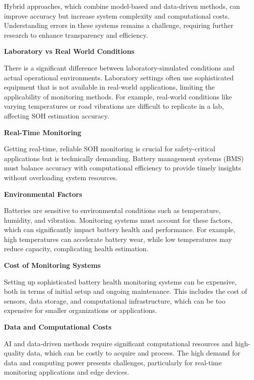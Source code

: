 Hybrid approaches, which combine model-based and data-driven methods, can improve accuracy but increase system complexity and computational costs. 
Understanding errors in these systems remains a challenge, requiring further research to enhance transparency and efficiency.

\vspace{1cm}
\textbf{Laboratory vs Real World Conditions}

There is a significant difference between laboratory-simulated conditions and actual operational environments. 
Laboratory settings often use sophisticated equipment that is not available in real-world applications, limiting the applicability of monitoring methods. For example, real-world conditions like varying temperatures or road vibrations are difficult to replicate in a lab, affecting SOH estimation accuracy.

\vspace{1cm}
\textbf{Real-Time Monitoring}

Getting real-time, reliable SOH monitoring is crucial for safety-critical applications but is technically demanding. 
Battery management systems (BMS) must balance accuracy with computational efficiency to provide timely insights without overloading system resources.

\vspace{1cm}
\textbf{Environmental Factors}

Batteries are sensitive to environmental conditions such as temperature, humidity, and vibration. 
Monitoring systems must account for these factors, which can significantly impact battery health and performance. 
For example, high temperatures can accelerate battery wear, while low temperatures may reduce capacity, complicating health estimation.

\vspace{1cm}
\textbf{Cost of Monitoring Systems}

Setting up sophisticated battery health monitoring systems can be expensive, both in terms of initial setup and ongoing maintenance. 
This includes the cost of sensors, data storage, and computational infrastructure, which can be too expensive for smaller organizations or applications.

\vspace{1cm}
\textbf{Data and Computational Costs}

AI and data-driven methods require significant computational resources and high-quality data, which can be costly to acquire and process. 
The high demand for data and computing power presents challenges, particularly for real-time monitoring applications and edge devices.

